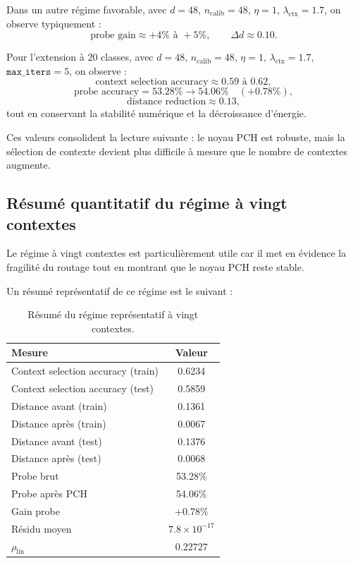 \documentclass[11pt,a4paper]{article}
\newcommand{\1}{\mathbf 1}
\begin{document}
Dans un autre régime favorable, avec \(d=48\), \(n_{\mathrm{calib}}=48\), \(\eta=1\), \(\lambda_{\mathrm{ctx}}=1.7\), on observe typiquement :
\[
\text{probe gain}\approx +4\% \text{ à } +5\%,
\qquad
\Delta d \approx 0.10.
\]

Pour l’extension à \(20\) classes, avec \(d=48\), \(n_{\mathrm{calib}}=48\), \(\eta=1\), \(\lambda_{\mathrm{ctx}}=1.7\), \(\texttt{max\_iters}=5\), on observe :
\[
\text{context selection accuracy}\approx 0.59 \text{ à } 0.62,
\]
\[
\text{probe accuracy}
=
53.28\%
\rightarrow
54.06\%
\quad
(+0.78\%),
\]
\[
\text{distance reduction}\approx 0.13,
\]
tout en conservant la stabilité numérique et la décroissance d’énergie.

Ces valeurs consolident la lecture suivante : le noyau PCH est robuste, mais la sélection de contexte devient plus difficile à mesure que le nombre de contextes augmente.

\subsection{Résumé quantitatif du régime à vingt contextes}

Le régime à vingt contextes est particulièrement utile car il met en évidence la fragilité du routage tout en montrant que le noyau PCH reste stable.

Un résumé représentatif de ce régime est le suivant :
\begin{table}[ht]
\centering
\small
\begin{tabular}{lc}
\toprule
Mesure & Valeur \\
\midrule
Context selection accuracy (train) & 0.6234 \\
Context selection accuracy (test) & 0.5859 \\
Distance avant (train) & 0.1361 \\
Distance après (train) & 0.0067 \\
Distance avant (test) & 0.1376 \\
Distance après (test) & 0.0068 \\
Probe brut & 53.28\% \\
Probe après PCH & 54.06\% \\
Gain probe & +0.78\% \\
Résidu moyen & $7.8\times10^{-17}$ \\
$\rho_{\mathrm{lin}}$ & 0.22727 \\
\bottomrule
\end{tabular}
\caption{Résumé du régime représentatif à vingt contextes.}
\label{tab:twenty_context_summary}
\end{table}
\end{document}
